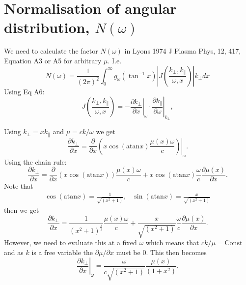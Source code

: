 \documentclass[]{article}
\begin{document}
\section{Normalisation of angular distribution, $N(\omega)$}
\label{NormingAngDistrib}
\newcommand{\atan}{\mathrm{atan}}
\newcommand{\st}{\right|}

We need to calculate the factor $N(\omega)$ in Lyons 1974  J Plasma Phys, 12, 417, Equation A3 or A5 for arbitrary $\mu$. I.e. 
\begin{equation}
N(\omega) = \frac{1}{(2\pi)^2} \int_0^\infty g_\omega( \tan^{-1} x ) \left| J \left( \frac{k_\perp, k_\parallel}{\omega, x} \right)\right| k_\perp d x
\end{equation}
Using Eq A6:
\begin{equation}
J \left( \frac{k_\perp, k_\parallel}{\omega, x} \right) = - \left.\frac{\partial k_\perp}{\partial x}\right|_\omega \cdot \left.\frac{\partial k_\parallel}{\partial \omega}\right|_{k_\perp}, 
\end{equation}

\noindent Using $k_\perp = x k_\parallel$ and $ \mu = c k /\omega$ we get 
\begin{equation}
\frac{\partial k_\perp}{\partial x} = \left. \frac{\partial}{\partial x} \left( x \cos(\atan x) \frac{\mu(x) \omega}{c}\right)\st_\omega.
\end{equation}
Using the chain rule:
\begin{equation}
\frac{\partial k_\perp}{\partial x} = \frac{\partial}{\partial x} \left( x \cos(\atan x)\right) \frac{\mu(x) \omega}{c} + x \cos(\atan x)\frac{\omega}{c}\frac{\partial \mu(x)}{\partial x}.
\end{equation}
Note that 
\begin{align}
\cos(\atan x) = \frac{1}{\sqrt{(x^2 + 1)}}, & \sin(\atan x) = \frac{x}{\sqrt{(x^2 + 1)}}
\end{align}
then we get
\begin{equation}
\frac{\partial k_\perp}{\partial x} = \frac{1}{(x^2+1)^\frac{3}{2}} \frac{\mu(x) \omega}{c} +\frac{x}{\sqrt{(x^2+1)}} \frac{\omega}{c}\frac{\partial \mu(x)}{\partial x}. 
\end{equation}
However, we need to evaluate this at a fixed $\omega$ which means that $ck/\mu = \mathrm{Const}$ and as $k$ is a free variable the $\partial\mu/\partial x$ must be 0. This then becomes
\begin{equation}
\left.\frac{\partial k_\perp}{\partial x}\st_\omega = \frac{\omega}{c \sqrt{(x^2+1)}}\frac{\mu(x)}{(1+x^2)} .
\end{equation}
\end{document}
